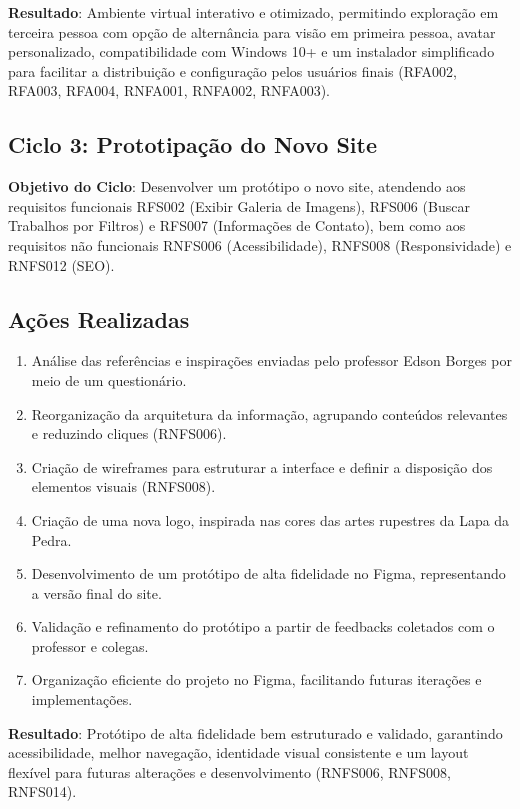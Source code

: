\textbf{Resultado}: Ambiente virtual interativo e otimizado, permitindo exploração em terceira pessoa com opção de alternância para visão em primeira pessoa, avatar personalizado, compatibilidade com Windows 10+ e um instalador simplificado para facilitar a distribuição e configuração pelos usuários finais (RFA002, RFA003, RFA004, RNFA001, RNFA002, RNFA003).

\subsection*{Ciclo 3: Prototipação do Novo Site} \label{subsec:ciclo3}

\textbf{Objetivo do Ciclo}: Desenvolver um protótipo o novo site, atendendo aos requisitos funcionais RFS002 (Exibir Galeria de Imagens), RFS006 (Buscar Trabalhos por Filtros) e RFS007 (Informações de Contato), bem como aos requisitos não funcionais RNFS006 (Acessibilidade), RNFS008 (Responsividade) e RNFS012 (SEO).

\subsection{Ações Realizadas}
\begin{enumerate}
    \item Análise das referências e inspirações enviadas pelo professor Edson Borges por meio de um questionário.
    \item Reorganização da arquitetura da informação, agrupando conteúdos relevantes e reduzindo cliques (RNFS006).
    \item Criação de wireframes para estruturar a interface e definir a disposição dos elementos visuais (RNFS008).
    \item Criação de uma nova logo, inspirada nas cores das artes rupestres da Lapa da Pedra.
    \item Desenvolvimento de um protótipo de alta fidelidade no Figma, representando a versão final do site.
    \item Validação e refinamento do protótipo a partir de feedbacks coletados com o professor e colegas.
    \item Organização eficiente do projeto no Figma, facilitando futuras iterações e implementações.
\end{enumerate}

\textbf{Resultado}: Protótipo de alta fidelidade bem estruturado e validado, garantindo acessibilidade, melhor navegação, identidade visual consistente e um layout flexível para futuras alterações e desenvolvimento (RNFS006, RNFS008, RNFS014).
